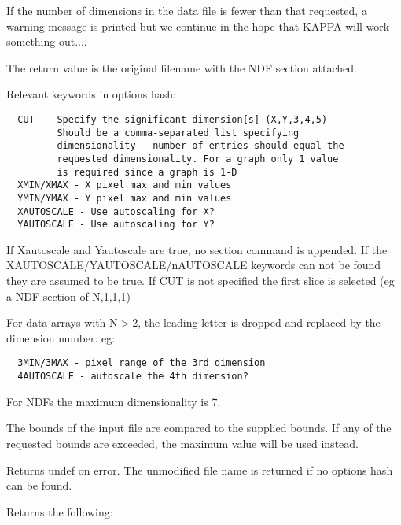 \begin{description}
If the number of dimensions in the data file
is fewer than that requested, a warning message is printed
but we continue in the hope that KAPPA will work something out....



The return value is the original filename with the
NDF section attached.



Relevant keywords in options hash:

\begin{verbatim}
  CUT  - Specify the significant dimension[s] (X,Y,3,4,5)
         Should be a comma-separated list specifying
         dimensionality - number of entries should equal the
         requested dimensionality. For a graph only 1 value
         is required since a graph is 1-D
  XMIN/XMAX - X pixel max and min values
  YMIN/YMAX - Y pixel max and min values
  XAUTOSCALE - Use autoscaling for X?
  YAUTOSCALE - Use autoscaling for Y?
\end{verbatim}


If Xautoscale and Yautoscale are true, no section command is appended.
If the XAUTOSCALE/YAUTOSCALE/nAUTOSCALE keywords can not be found they are
assumed to be true. If CUT is not specified  the first slice is
selected (eg a NDF section of N,1,1,1)



For data arrays with N$>$2, the leading letter is dropped and replaced
by the dimension number. eg:

\begin{verbatim}
  3MIN/3MAX - pixel range of the 3rd dimension
  4AUTOSCALE - autoscale the 4th dimension?
\end{verbatim}


For NDFs the maximum dimensionality is 7.



The bounds of the input file are compared to the supplied bounds.
If any of the requested bounds are exceeded, the maximum value
will be used instead.



Returns undef on error.
The unmodified file name is returned if no options hash can be found.



Returns the following:


\end{description}
